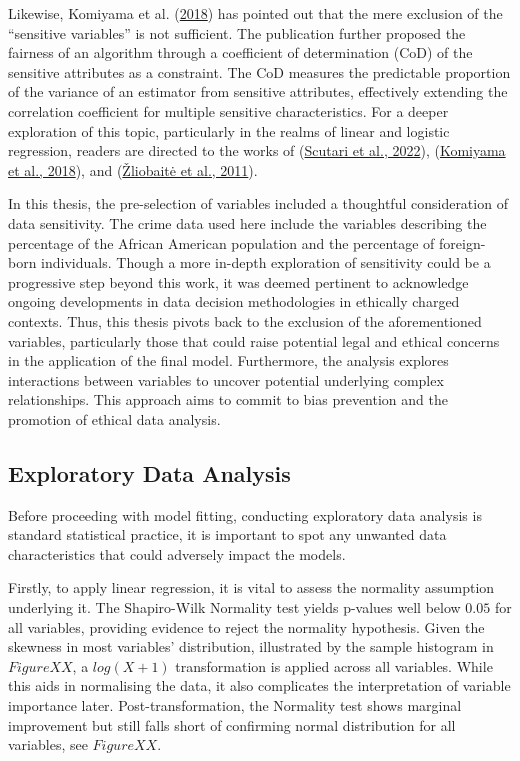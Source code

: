 \documentclass[
  11pt,
]{article}
\begin{document}
Likewise, Komiyama et al. (\protect\hyperlink{ref-Komiyama2018}{2018})
has pointed out that the mere exclusion of the ``sensitive variables''
is not sufficient. The publication further proposed the fairness of an
algorithm through a coefficient of determination (CoD) of the sensitive
attributes as a constraint. The CoD measures the predictable proportion
of the variance of an estimator from sensitive attributes, effectively
extending the correlation coefficient for multiple sensitive
characteristics. For a deeper exploration of this topic, particularly in
the realms of linear and logistic regression, readers are directed to
the works of (\protect\hyperlink{ref-Scutari2022}{Scutari et al.,
2022}), (\protect\hyperlink{ref-Komiyama2018}{Komiyama et al., 2018}),
and (\protect\hyperlink{ref-Zliobaite2011}{Žliobaitė et al., 2011}).

In this thesis, the pre-selection of variables included a thoughtful
consideration of data sensitivity. The crime data used here include the
variables describing the percentage of the African American population
and the percentage of foreign-born individuals. Though a more in-depth
exploration of sensitivity could be a progressive step beyond this work,
it was deemed pertinent to acknowledge ongoing developments in data
decision methodologies in ethically charged contexts. Thus, this thesis
pivots back to the exclusion of the aforementioned variables,
particularly those that could raise potential legal and ethical concerns
in the application of the final model. Furthermore, the analysis
explores interactions between variables to uncover potential underlying
complex relationships. This approach aims to commit to bias prevention
and the promotion of ethical data analysis.

\subsection{Exploratory Data Analysis}

Before proceeding with model fitting, conducting exploratory data
analysis is standard statistical practice, it is important to spot any
unwanted data characteristics that could adversely impact the models.

Firstly, to apply linear regression, it is vital to assess the normality
assumption underlying it. The Shapiro-Wilk Normality test yields
p-values well below \(0.05\) for all variables, providing evidence to
reject the normality hypothesis. Given the skewness in most variables'
distribution, illustrated by the sample histogram in \(Figure XX\), a
\(log(X + 1)\) transformation is applied across all variables. While
this aids in normalising the data, it also complicates the
interpretation of variable importance later. Post-transformation, the
Normality test shows marginal improvement but still falls short of
confirming normal distribution for all variables, see \(Figure XX\).
\end{document}
